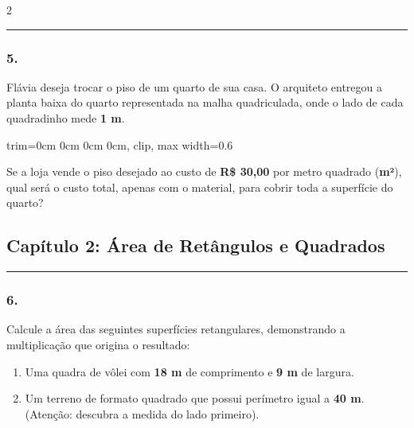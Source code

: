 \documentclass[twoside, 10pt, a4paper]{article}
\newlength{\espacoPosTitulo}\setlength{\espacoPosTitulo}{0.3cm}
\newlength{\espacoPreQuestao}\setlength{\espacoPreQuestao}{0.1cm}
\newlength{\espacoQuestao}\setlength{\espacoQuestao}{0.2cm}
\newlength{\espacoAlt}\setlength{\espacoAlt}{0.2cm}
\begin{document}
\begin{multicols*}{2}
\noindent\textcolor{CorLinha}{\rule{\linewidth}{0.5pt}} 
\par\vspace{\espacoPreQuestao}
\subsubsection*{5.} Flávia deseja trocar o piso de um quarto de sua casa. O arquiteto entregou a planta baixa do quarto representada na malha quadriculada, onde o lado de cada quadradinho mede \textbf{1 m}.

\begin{center}
\begin{adjustbox}{trim=0cm 0cm 0cm 0cm, clip, max width=0.6\linewidth}
\end{adjustbox}
\end{center}

Se a loja vende o piso desejado ao custo de \textbf{R\$ 30,00} por metro quadrado (\textbf{m²}), qual será o custo total, apenas com o material, para cobrir toda a superfície do quarto?
\par\vspace{\espacoQuestao}

\subsection*{Capítulo 2: Área de Retângulos e Quadrados}
\vspace{-0.2cm}\noindent\rule{\linewidth}{1.5pt} 
\par\vspace{\espacoPosTitulo}

\subsubsection*{6.} Calcule a área das seguintes superfícies retangulares, demonstrando a multiplicação que origina o resultado:
\begin{enumerate}[label=\alph*), itemsep=\espacoAlt]
    \item Uma quadra de vôlei com \textbf{18 m} de comprimento e \textbf{9 m} de largura.
    \item Um terreno de formato quadrado que possui perímetro igual a \textbf{40 m}. (Atenção: descubra a medida do lado primeiro).
\end{enumerate}
\par\vspace{\espacoQuestao}


\end{multicols*}
\end{document}
